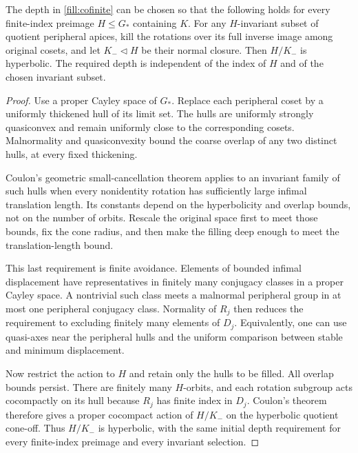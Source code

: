 \begin{lemma}\label{fill:selective-hyp}
The depth in \eqref{fill:cofinite} can be chosen so that the following holds
for every finite-index preimage \(H\le G_*\) containing \(K\).
For any \(H\)-invariant subset of quotient peripheral apices, kill the
rotations over its full inverse image among original cosets, and let
\(K_-\lhd H\) be their normal closure.
Then \(H/K_-\) is hyperbolic.
The required depth is independent of the index of \(H\) and of the chosen
invariant subset.
\end{lemma}

\begin{proof}
Use a proper Cayley space of \(G_*\).  Replace each peripheral coset by a
uniformly thickened hull of its limit set.  The hulls are uniformly strongly
quasiconvex and remain uniformly close to the corresponding cosets.
Malnormality and quasiconvexity bound the coarse overlap of any two distinct
hulls, at every fixed thickening.

Coulon's geometric small-cancellation theorem
\cite[Theorem~6.11]{Coulon2014} applies to an invariant family of such
hulls when every
nonidentity rotation has sufficiently large infimal translation length.
Its constants depend on the hyperbolicity and overlap bounds, not on the
number of orbits.  Rescale the original space first to meet those bounds,
fix the cone radius, and then make the filling deep enough to meet the
translation-length bound.

This last requirement is finite avoidance.  Elements of bounded infimal
displacement have representatives in finitely many conjugacy classes in a
proper Cayley space.  A nontrivial such class meets a malnormal peripheral
group in at most one peripheral conjugacy class.  Normality of \(R_j\) then
reduces the requirement to excluding finitely many elements of \(D_j\).
Equivalently, one can use quasi-axes near the peripheral hulls and the
uniform comparison between stable and minimum displacement.

Now restrict the action to \(H\) and retain only the hulls to be filled.
All overlap bounds persist.  There are finitely many \(H\)-orbits, and each
rotation subgroup acts cocompactly on its hull because \(R_j\) has finite
index in \(D_j\).  Coulon's theorem therefore gives a proper cocompact
action of \(H/K_-\) on the hyperbolic quotient cone-off.
Thus \(H/K_-\) is hyperbolic, with the same initial depth requirement
for every finite-index preimage and every invariant selection.
\end{proof}

